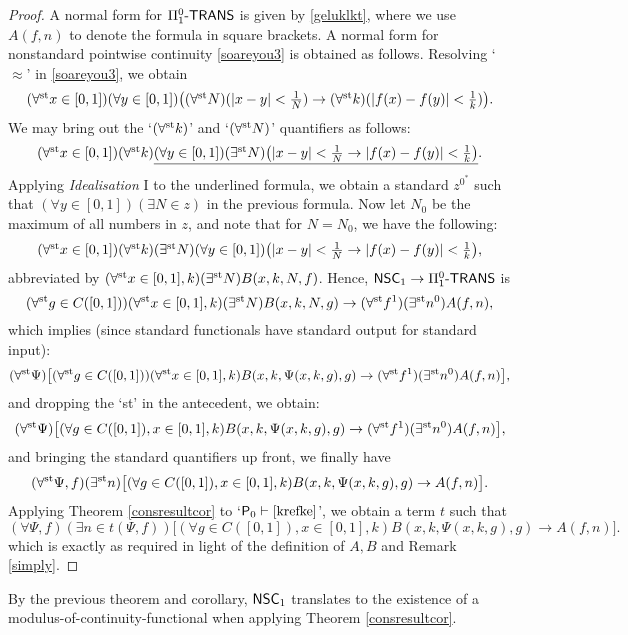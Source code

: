 \documentclass[reqno]{amsart}
\newcommand\be{\begin{equation}}
\newcommand\ee{\end{equation}}
\def\P{\textup{\textsf{P}}}
\def\N{{\mathbb  N}}
\def\st{\textup{st}}
\def\di{\rightarrow}
\def\paai{\Pi_{1}^{0}\textup{-\textsf{TRANS}}}
\def\NSC{\textup{\textsf{NSC}}}
\numberwithin{equation}{section}
\numberwithin{thm}{section}
\begin{document}
\begin{proof}
A normal form for $\paai$ is given by \eqref{geluklkt}, where we use $A(f, n)$ to denote the formula in square brackets.  
A normal form for nonstandard pointwise continuity \eqref{soareyou3} is obtained as follows.  %
Resolving `$\approx$' in \eqref{soareyou3}, we obtain  
\[\textstyle
(\forall^{\st}x\in [0,1])(\forall y\in [0,1])\big( (\forall^{\st}N) (|x- y|<\frac{1}{N}) \di (\forall^{\st}k )(|f(x)- f(y)|<\frac{1}{k})\big).  
\]
We may bring out the `$(\forall^{\st}k)$' and `$(\forall^{\st}N) $' quantifiers as follows:
\[\textstyle
(\forall^{\st}x\in [0,1])(\forall^{\st}k)\underline{(\forall y\in [0,1])(\exists^{\st}N)\big( |x- y|<\frac{1}{N} \di|f(x)- f(y)|<\frac{1}{k}\big)}.  
\]
Applying \emph{Idealisation} \textsf{I} to the underlined formula, we obtain a standard $z^{0^{*}}$ such that $(\forall y\in [0,1])(\exists N\in z)$ in the previous formula.  
Now let $N_{0}$ be the maximum of all numbers in $z$, and note that for $N=N_{0}$, we have the following:
\[\textstyle
(\forall^{\st}x\in [0,1])(\forall^{\st}k)(\exists^{\st}N)(\forall y\in [0,1])\big( |x- y|<\frac{1}{N} \di|f(x)- f(y)|<\frac{1}{k}\big), 
\]
abbreviated by $(\forall^{\st}x\in [0,1],k)(\exists^{\st}N)B(x, k, N, f)$.  Hence, $\NSC_{1}\di \paai$ is  
\[
(\forall^{\st}g\in C([0,1]))(\forall^{\st}x\in [0,1], k)(\exists^{\st}N)B(x, k, N, g)\di (\forall^{\st} f^{1})(\exists^{\st}n^{0})A(f,n), 
\]
which implies (since standard functionals have standard output for standard input):
\[
(\forall^{\st}\Psi)\big[(\forall^{\st}g\in C([0,1]))(\forall^{\st}x\in [0,1], k)B(x, k, \Psi(x, k, g), g)\di (\forall^{\st} f^{1})(\exists^{\st}n^{0})A(f,n)\big], 
\]
and dropping the `st' in the antecedent, we obtain:
\[
(\forall^{\st}\Psi)\big[(\forall g\in C([0,1]), x\in [0,1], k)B(x, k, \Psi(x, k, g), g)\di (\forall^{\st} f^{1})(\exists^{\st}n^{0})A(f,n)\big], 
\]
and bringing the standard quantifiers up front, we finally have
\be\label{krefke}
(\forall^{\st}\Psi, f)(\exists^{\st}n)\big[(\forall g\in C([0,1]), x\in [0,1], k)B(x, k, \Psi(x, k, g), g)\di A(f,n)\big].
\ee
Applying Theorem \ref{consresultcor} to `$\P_{0}\vdash \eqref{krefke}$', we obtain a term $t$ such that
\[
(\forall \Psi, f)(\exists n\in t(\Psi, f))\big[(\forall g\in C([0,1]), x\in [0,1], k)B(x, k, \Psi(x, k, g), g)\di A(f,n)\big].
\]
which is exactly as required in light of the definition of $A, B$ and Remark \ref{simply}.
\end{proof}
By the previous theorem and corollary, $\NSC_{1}$ translates to the existence of a modulus-of-continuity-functional when applying Theorem \ref{consresultcor}.  
\end{document}
